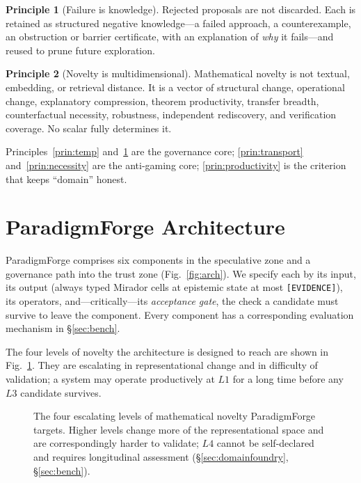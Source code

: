 \documentclass[11pt]{article}
\theoremstyle{definition}
\newtheorem{principle}{Principle}
\theoremstyle{remark}
\newcommand{\state}[1]{\texttt{[#1]}}
\newcommand{\PF}{ParadigmForge}
\begin{document}
\begin{principle}[Failure is knowledge]
\label{prin:failure}
Rejected proposals are not discarded. Each is retained as structured negative knowledge---a failed
approach, a counterexample, an obstruction or barrier certificate, with an explanation of \emph{why}
it fails---and reused to prune future exploration.
\end{principle}

\begin{principle}[Novelty is multidimensional]
\label{prin:novelty}
Mathematical novelty is not textual, embedding, or retrieval distance. It is a vector of structural
change, operational change, explanatory compression, theorem productivity, transfer breadth,
counterfactual necessity, robustness, independent rediscovery, and verification coverage. No scalar
fully determines it.
\end{principle}

Principles~\ref{prin:temp} and~\ref{prin:failure} are the governance core; \ref{prin:transport}
and~\ref{prin:necessity} are the anti-gaming core; \ref{prin:productivity} is the criterion that
keeps ``domain'' honest.

\section{ParadigmForge Architecture}
\label{sec:arch}

\PF{} comprises six components in the speculative zone and a governance path into the trust zone
(Fig.~\ref{fig:arch}). We specify each by its input, its output (always typed Mirador cells at
epistemic state at most \state{EVIDENCE}), its operators, and---critically---its \emph{acceptance
gate}, the check a candidate must survive to leave the component. Every component has a corresponding
evaluation mechanism in \S\ref{sec:bench}.

The four levels of novelty the architecture is designed to reach are shown in
Fig.~\ref{fig:levels}. They are escalating in representational change and in difficulty of
validation; a system may operate productively at $L1$ for a long time before any $L3$ candidate
survives.

\begin{figure}[t]
\centering
\resizebox{0.92\textwidth}{!}{}
\caption{The four escalating levels of mathematical novelty \PF{} targets. Higher levels change more
of the representational space and are correspondingly harder to validate; $L4$ cannot be
self-declared and requires longitudinal assessment (\S\ref{sec:domainfoundry}, \S\ref{sec:bench}).}
\label{fig:levels}
\end{figure}
\end{document}
